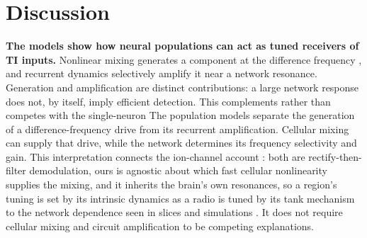 \documentclass[11pt,a4paper]{article}
\providecommand{\DIFaddtex}[1]{{\protect\color{blue} \sf #1}} %
\providecommand{\DIFdeltex}[1]{{\protect\color{red} \scriptsize #1}} %
\providecommand{\DIFaddbegin}{} %
\providecommand{\DIFaddend}{} %
\providecommand{\DIFdelbegin}{} %
\providecommand{\DIFdelend}{} %
\providecommand{\DIFadd}[1]{\texorpdfstring{\DIFaddtex{#1}}{#1}} %
\providecommand{\DIFdel}[1]{\texorpdfstring{\DIFdeltex{#1}}{}} %
\begin{document}
\section{Discussion}\label{sec:discussion}
\DIFdelbegin \DIFdel{\textbf{The models show how neural populations can act as tuned receivers of TI
inputs.} Nonlinear mixing generates a component at the
difference frequency , and recurrent
dynamics selectively amplify it near a network resonance. Generation and amplification are
distinct contributions: a large network response does not, by itself, imply efficient
detection. This complements rather than competes with the single-neuron }\DIFdelend \DIFaddbegin \DIFadd{The population models separate the generation of a difference-frequency drive from
its recurrent amplification. Cellular mixing can supply that drive, while the
network determines its frequency selectivity and gain. This interpretation connects
the }\DIFaddend ion-channel \DIFdelbegin \DIFdel{account \cite{mirzakhalili2020}: both are rectify-then-filter demodulation, ours is
agnostic about which fast cellular nonlinearity supplies the mixing, and it inherits the
brain's own resonances, so a region's tuning is set by its intrinsic dynamics as a radio
is tuned by its tank}\DIFdelend \DIFaddbegin \DIFadd{mechanism \cite{mirzakhalili2020,luff2024mixer} to the network
dependence seen in slices and simulations \cite{caldas2024,karimi2024,soroushi2025}.
It does not require cellular mixing and circuit amplification to be competing
explanations}\DIFaddend .
\end{document}
